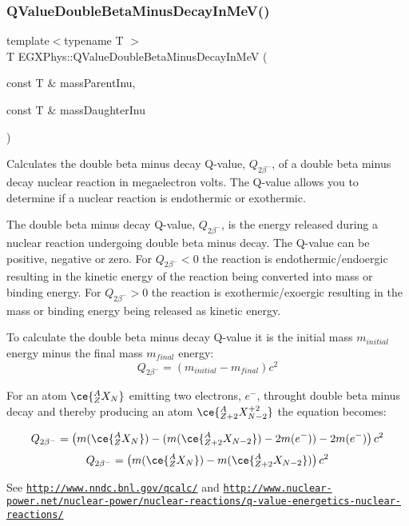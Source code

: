 \subsubsection{\texorpdfstring{Q\+Value\+Double\+Beta\+Minus\+Decay\+In\+Me\+V()}{QValueDoubleBetaMinusDecayInMeV()}}
{\footnotesize\ttfamily template$<$typename T $>$ \\
T E\+G\+X\+Phys\+::\+Q\+Value\+Double\+Beta\+Minus\+Decay\+In\+MeV (\begin{DoxyParamCaption}\item[{const T \&}]{mass\+Parent\+Inu,  }\item[{const T \&}]{mass\+Daughter\+Inu }\end{DoxyParamCaption})}



Calculates the double beta minus decay Q-\/value, $Q_{2\beta^-}$, of a double beta minus decay nuclear reaction in megaelectron volts. The Q-\/value allows you to determine if a nuclear reaction is endothermic or exothermic. 

The double beta minus decay Q-\/value, $Q_{2\beta^-}$, is the energy released during a nuclear reaction undergoing double beta minus decay. The Q-\/value can be positive, negative or zero. For $Q_{2\beta^-} < 0$ the reaction is endothermic/endoergic resulting in the kinetic energy of the reaction being converted into mass or binding energy. For $Q_{2\beta^-} > 0$ the reaction is exothermic/exoergic resulting in the mass or binding energy being released as kinetic energy.

To calculate the double beta minus decay Q-\/value it is the initial mass $m_{initial}$ energy minus the final mass $m_{final}$ energy\+: \[Q_{2\beta^-} = \left ( m_{initial}-m_{final}\right ) c^2\]

For an atom $\ce{ ^{A}_{Z}X_{N} }$ emitting two electrons, $e^-$, throught double beta minus decay and thereby producing an atom $\ce{ ^{A}_{Z{+2}}X^{+2}_{N-2} }$ the equation becomes\+:

\[Q_{2\beta^-} = \left ( m(\ce{ ^{A}_{Z}X_{N} }) - (m(\ce{ ^{A}_{Z{+2}}X_{N-2} }) - 2m(e^-)) - 2m(e^-)\right ) c^2\] \[Q_{2\beta^-} = \left ( m(\ce{ ^{A}_{Z}X_{N} }) - m(\ce{ ^{A}_{Z{+2}}X_{N-2} })\right ) c^2\]

See \href{http://www.nndc.bnl.gov/qcalc/}{\tt http\+://www.\+nndc.\+bnl.\+gov/qcalc/} and \href{http://www.nuclear-power.net/nuclear-power/nuclear-reactions/q-value-energetics-nuclear-reactions/}{\tt http\+://www.\+nuclear-\/power.\+net/nuclear-\/power/nuclear-\/reactions/q-\/value-\/energetics-\/nuclear-\/reactions/}


